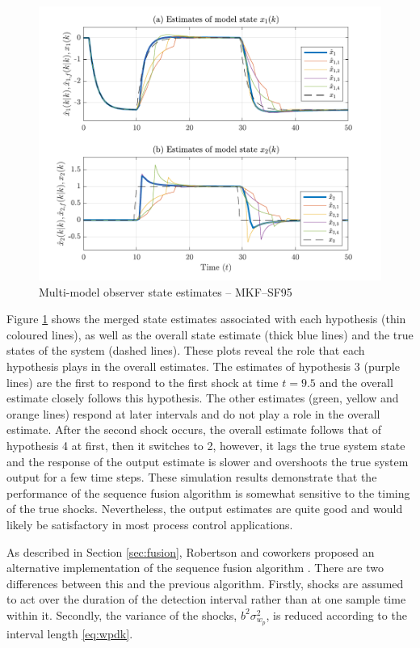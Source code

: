 \begin{figure}[htp]
	\centering
	\includegraphics[width=13cm]{images/rod_MKF_test_sim_MKF_SF95_x_est.pdf}
	\caption{Multi-model observer state estimates – MKF--SF95}
	\label{fig:rod-obs-sim-test-x_est-SF95}
\end{figure}
Figure \ref{fig:rod-obs-sim-test-x_est-SF95} shows the merged state estimates associated with each hypothesis (thin coloured lines), as well as the overall state estimate (thick blue lines) and the true states of the system (dashed lines). These plots reveal the role that each hypothesis plays in the overall estimates. The estimates of hypothesis 3 (purple lines) are the first to respond to the first shock at time $t=9.5$ and the overall estimate closely follows this hypothesis. The other estimates (green, yellow and orange lines) respond at later intervals and do not play a role in the overall estimate. After the second shock occurs, the overall estimate follows that of hypothesis 4 at first, then it switches to 2, however, it lags the true system state and the response of the output estimate is slower and overshoots the true system output for a few time steps. These simulation results demonstrate that the performance of the sequence fusion algorithm is somewhat sensitive to the timing of the true shocks. Nevertheless, the output estimates are quite good and would likely be satisfactory in most process control applications. 

As described in Section \ref{sec:fusion}, Robertson and coworkers proposed an alternative implementation of the sequence fusion algorithm \citep{robertson_method_1998}. There are two differences between this and the previous algorithm. Firstly, shocks are assumed to act over the duration of the detection interval rather than at one sample time within it. Secondly, the variance of the shocks, $b^2\sigma_{w_p}^2$, is reduced according to the interval length \eqref{eq:wpdk}.

